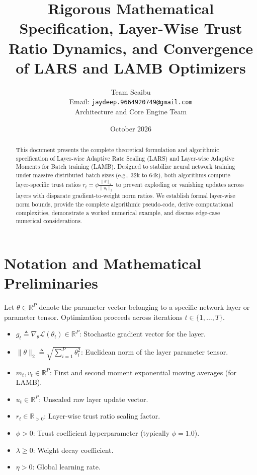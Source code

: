 \documentclass[11pt,a4paper]{article}
\title{\textbf{Rigorous Mathematical Specification, Layer-Wise Trust Ratio Dynamics, and Convergence of LARS and LAMB Optimizers}}
\author{Team Scaibu \\ \small Email: \texttt{jaydeep.9664920749@gmail.com} \\ \small Architecture and Core Engine Team}
\date{October 2026}
\theoremstyle{definition}
\begin{document}
\maketitle

\begin{abstract}
This document presents the complete theoretical formulation and algorithmic specification of Layer-wise Adaptive Rate Scaling (LARS) and Layer-wise Adaptive Moments for Batch training (LAMB). Designed to stabilize neural network training under massive distributed batch sizes (e.g., $32\text{k}$ to $64\text{k}$), both algorithms compute layer-specific trust ratios $r_t = \phi \frac{\|\theta\|_2}{\|u_t\|_2}$ to prevent exploding or vanishing updates across layers with disparate gradient-to-weight norm ratios. We establish formal layer-wise norm bounds, provide the complete algorithmic pseudo-code, derive computational complexities, demonstrate a worked numerical example, and discuss edge-case numerical considerations.
\end{abstract}

\section{Notation and Mathematical Preliminaries}

Let $\theta \in \mathbb{R}^P$ denote the parameter vector belonging to a specific network layer or parameter tensor. Optimization proceeds across iterations $t \in \{1, \dots, T\}$.

\begin{itemize}
    \item $g_t \triangleq \nabla_\theta \mathcal{L}(\theta_t) \in \mathbb{R}^P$: Stochastic gradient vector for the layer.
    \item $\|\theta\|_2 \triangleq \sqrt{\sum_{i=1}^P \theta_i^2}$: Euclidean norm of the layer parameter tensor.
    \item $m_t, v_t \in \mathbb{R}^P$: First and second moment exponential moving averages (for LAMB).
    \item $u_t \in \mathbb{R}^P$: Unscaled raw layer update vector.
    \item $r_t \in \mathbb{R}_{> 0}$: Layer-wise trust ratio scaling factor.
    \item $\phi > 0$: Trust coefficient hyperparameter (typically $\phi = 1.0$).
    \item $\lambda \ge 0$: Weight decay coefficient.
    \item $\eta > 0$: Global learning rate.
\end{itemize}
\end{document}
